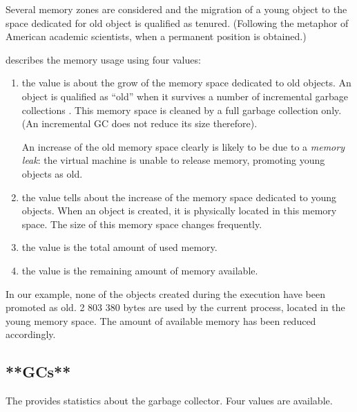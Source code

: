 \documentclass[a4paper,10pt,twoside]{book}
\begin{document}
Several memory zones are considered and the migration of a young object to the space dedicated for old object is qualified as tenured. (Following the metaphor of American academic scientists, when a permanent position is obtained.)

 describes the memory usage using four values:

\begin{enumerate}

\item the  value is about the grow of the memory space dedicated to old objects. An object is qualified as ``old'' when it survives a number of incremental garbage collections . This memory space is cleaned by a full garbage collection only. (An incremental GC does not reduce its size therefore). 

An increase of the old memory space clearly is likely to be due to a \emph{memory leak}: the virtual machine is unable to release memory, promoting young objects as old.

\item the  value tells about the increase of the memory space dedicated to young objects. When an object is created, it is physically located in this memory space. The size of this memory space changes frequently. 

\item the  value is the total amount of used memory.

\item the  value is the remaining amount of memory available.
\end{enumerate}

In our example, none of the objects created during the execution have been promoted as old. 2 803 380 bytes are used by the current process, located in the young memory space. The amount of available memory has been reduced accordingly.

\subsection{**GCs**}

The  provides statistics about the garbage collector. Four values are available.
\end{document}

